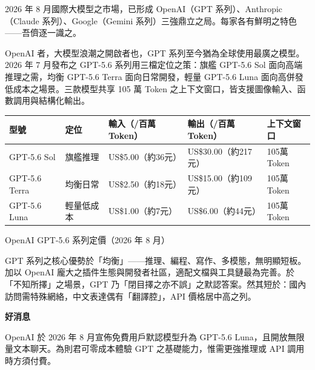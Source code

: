 


2026 年 8 月國際大模型之市場，已形成 OpenAI（GPT 系列）、Anthropic（Claude 系列）、Google（Gemini 系列）三強鼎立之局。每家各有鮮明之特色——吾儕逐一識之。


OpenAI 者，大模型浪潮之開啟者也，GPT 系列至今猶為全球使用最廣之模型。2026 年 7 月發布之 GPT-5.6 系列用三檔定位之策：旗艦 GPT-5.6 Sol 面向高端推理之需，均衡 GPT-5.6 Terra 面向日常開發，輕量 GPT-5.6 Luna 面向高併發低成本之場景。三款模型共享 105 萬 Token 之上下文窗口，皆支援圖像輸入、函數調用與結構化輸出。

\begin{center}
\begin{tabularx}{\linewidth}{|X|X|X|X|X|}
\hline
\textbf{型號} & \textbf{定位} & \textbf{輸入（/百萬Token）} & \textbf{輸出（/百萬Token）} & \textbf{上下文窗口} \tabularnewline
\hline
GPT-5.6 Sol & 旗艦推理 & US\$5.00（約36元） & US\$30.00（約217元） & 105萬Token \tabularnewline
GPT-5.6 Terra & 均衡日常 & US\$2.50（約18元） & US\$15.00（約109元） & 105萬Token \tabularnewline
GPT-5.6 Luna & 輕量低成本 & US\$1.00（約7元） & US\$6.00（約44元） & 105萬Token \tabularnewline
\hline
\end{tabularx}
\end{center}

\begin{center}\small\color{gray}OpenAI GPT-5.6 系列定價（2026 年 8 月）\end{center}

GPT 系列之核心優勢於「均衡」——推理、編程、寫作、多模態，無明顯短板。加以 OpenAI 龐大之插件生態與開發者社區，適配文檔與工具鏈最為完善。於「不知所擇」之場景，GPT 乃「閉目擇之亦不誤」之默認答案。然其短於：國內訪問需特殊網絡，中文表達偶有「翻譯腔」，API 價格居中高之列。

\textbf{好消息}\par

OpenAI 於 2026 年 8 月宣佈免費用戶默認模型升為 GPT-5.6 Luna，且開放無限量文本聊天。為則君可零成本體驗 GPT 之基礎能力，惟需更強推理或 API 調用時方須付費。

